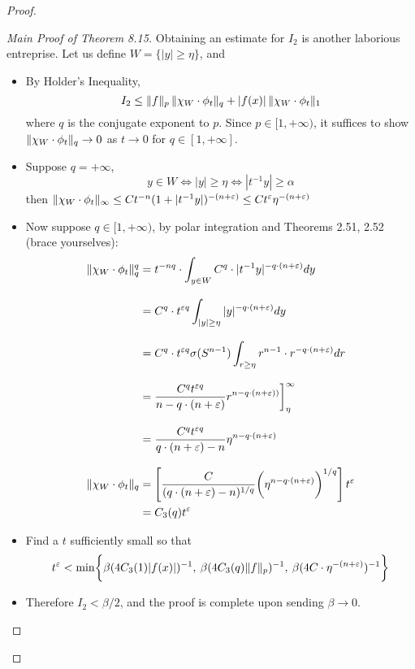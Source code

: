 \documentclass[../../main.tex]{subfiles}
\begin{document}
\begin{proof}
\begin{proof}[Main Proof of Theorem 8.15]
    Obtaining an estimate for $I_2$ is another laborious entreprise. Let us define $W = \{|y|\geq \eta\}$, and
    \begin{itemize}
        \item By Holder's Inequality, \[I_2\leq \lVert {f} \rVert_p\,\lVert {\chi_W\cdot \phi_t} \rVert_q + |f(x)|\,\lVert {\chi_W\cdot\phi_t} \rVert_1\] where $q$ is the conjugate exponent to $p$. Since $p\in[1,+\infty)$, it suffices to show $\lVert {\chi_W\cdot \phi_t} \rVert_q\to 0$ as $t\to 0$ for $q\in[1,+\infty]$.
        \item Suppose $q = +\infty$, 
        \[y\in W\iff |y|\geq\eta\iff |t^{-1}y|\geq\alpha\]
        then $\lVert {\chi_W\cdot \phi_t} \rVert_\infty\leq Ct^{-n}(1+|t^{-1}y|)^{-(n+\varepsilon)}\leq Ct^{\varepsilon}\eta^{-(n+\varepsilon)}$
        \item Now suppose $q\in[1,+\infty)$, by polar integration and Theorems 2.51, 2.52 (brace yourselves):
        \begin{align*}
            \lVert {\chi_W\cdot\phi_t} \rVert_q^q&=t^{-nq}\cdot\int_{y\in W}C^q\cdot|t^{-1}y|^{-q\cdot(n+\varepsilon)}dy\\[2ex]
            &= C^q\cdot t^{\varepsilon q}\int_{|y|\geq \eta}|y|^{-q\cdot(n+\varepsilon)}dy\\[2ex]
            &= C^q\cdot t^{\varepsilon q}\sigma(S^{n-1})\int_{r\geq\eta}r^{n-1}\cdot r^{-q\cdot(n+\varepsilon)}dr\\[2ex]
            &=\dfrac{C^qt^{\varepsilon q}}{n- q\cdot(n+\varepsilon)}r^{n-q\cdot(n+\varepsilon))}\biggr]^\infty_\eta\\[2ex]
            &=\dfrac{C^qt^{\varepsilon q}}{q\cdot(n+\varepsilon)-n}\eta^{n-q\cdot(n+\varepsilon)}\\[2ex]
            \lVert {\chi_W\cdot\phi_t} \rVert_q&=\left[\dfrac{C}{(q\cdot(n+\varepsilon)-n)^{1/q}}\biggl(\eta^{n-q\cdot(n+\varepsilon)}\biggr)^{1/q}\right]t^{\varepsilon}\\
            &=C_3(q)t^\varepsilon
        \end{align*}
        \item Find a $t$ sufficiently small so that
        \[
        t^\varepsilon< \min\biggl\{\beta(4C_3(1)|f(x)|)^{-1}
        ,\: \beta(4C_3(q)\lVert {f} \rVert_p)^{-1}\\[2ex]
        ,\: \beta(4C\cdot \eta^{-(n+\varepsilon)})^{-1}\biggr\}
        \]
        
        \item Therefore $I_2<\beta/2$, and the proof is complete upon sending $\beta\to 0$.
    \end{itemize}
\end{proof}\newpage
\end{proof}
\end{document}
